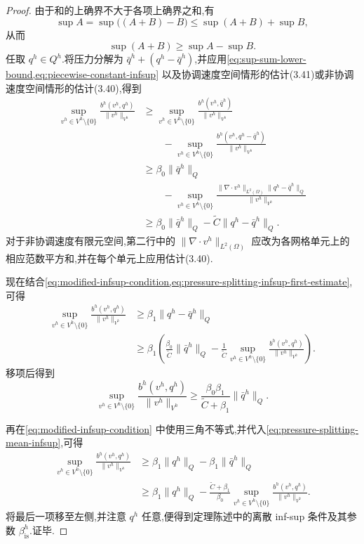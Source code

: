 \begin{proof}
由于和的上确界不大于各项上确界之和,有
\[
  \sup A=\sup\bigl((A+B)-B\bigr)
  \le \sup(A+B)+\sup B,
\]
从而
\begin{equation}\label{eq:sup-sum-lower-bound}
  \sup(A+B)\ge\sup A-\sup B.
\end{equation}
任取 $q^h\in Q^h$.将压力分解为 $\bar q^h+(q^h-\bar q^h)$,并应用\cref{eq:sup-sum-lower-bound,eq:piecewise-constant-infsup} 以及协调速度空间情形的估计(3.41)或非协调速度空间情形的估计(3.40),得到
\begin{equation}\label{eq:pressure-splitting-infsup-first-estimate}
\begin{aligned}
  \sup_{v^h\in V^h\setminus\{0\}}
    \frac{b^h(v^h,q^h)}{\|v^h\|_{V^h}}
  &\ge
    \sup_{v^h\in V^h\setminus\{0\}}
      \frac{b^h(v^h,\bar q^h)}{\|v^h\|_{V^h}}\\
  &\qquad-
    \sup_{v^h\in V^h\setminus\{0\}}
      \frac{b^h(v^h,q^h-\bar q^h)}{\|v^h\|_{V^h}}\\
  &\ge \beta_0\|\bar q^h\|_Q\\
  &\qquad-
    \sup_{v^h\in V^h\setminus\{0\}}
        \frac{\|\nabla\cdot v^h\|_{L^2(\Omega)}
              \|q^h-\bar q^h\|_Q}{\|v^h\|_{V^h}}\\
  &\ge \beta_0\|\bar q^h\|_Q
      -\widetilde C\|q^h-\bar q^h\|_Q.
\end{aligned}
\end{equation}
对于非协调速度有限元空间,第二行中的 $\|\nabla\cdot v^h\|_{L^2(\Omega)}$ 应改为各网格单元上的相应范数平方和,并在每个单元上应用估计(3.40).

现在结合\cref{eq:modified-infsup-condition,eq:pressure-splitting-infsup-first-estimate},可得
\[
\begin{aligned}
  \sup_{v^h\in V^h\setminus\{0\}}
    \frac{b^h(v^h,q^h)}{\|v^h\|_{V^h}}
  &\ge \beta_1\|q^h-\bar q^h\|_Q\\
  &\ge \beta_1\left(
      \frac{\beta_0}{\widetilde C}\|\bar q^h\|_Q
      -\frac{1}{\widetilde C}
       \sup_{v^h\in V^h\setminus\{0\}}
        \frac{b^h(v^h,q^h)}{\|v^h\|_{V^h}}
       \right).
\end{aligned}
\]
移项后得到
\begin{equation}\label{eq:pressure-splitting-mean-infsup}
  \sup_{v^h\in V^h\setminus\{0\}}
    \frac{b^h(v^h,q^h)}{\|v^h\|_{V^h}}
  \ge
  \frac{\beta_0\beta_1}{\widetilde C+\beta_1}
       \|\bar q^h\|_Q.
\end{equation}

再在\cref{eq:modified-infsup-condition} 中使用三角不等式,并代入\cref{eq:pressure-splitting-mean-infsup},可得
\[
\begin{aligned}
  \sup_{v^h\in V^h\setminus\{0\}}
    \frac{b^h(v^h,q^h)}{\|v^h\|_{V^h}}
  &\ge \beta_1\|q^h\|_Q-\beta_1\|\bar q^h\|_Q\\
  &\ge \beta_1\|q^h\|_Q
   -\frac{\widetilde C+\beta_1}{\beta_0}
      \sup_{v^h\in V^h\setminus\{0\}}
        \frac{b^h(v^h,q^h)}{\|v^h\|_{V^h}}.
\end{aligned}
\]
将最后一项移至左侧,并注意 $q^h$ 任意,便得到定理陈述中的离散 inf-sup 条件及其参数 $\beta_{\mathrm{is}}^h$.证毕.
\end{proof}

